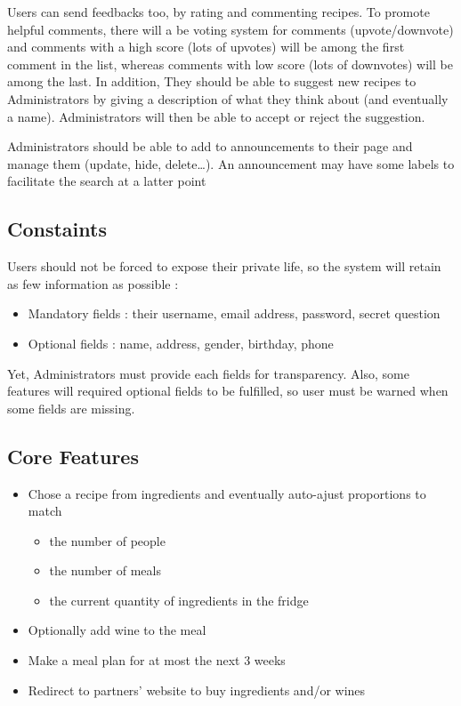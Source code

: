 \documentclass[english,12pt,twoside,a4paper]{article}
\begin{document}
Users can send feedbacks too, by rating and commenting recipes. To promote helpful comments, there will a be voting system for comments (upvote/downvote) and comments with a high score (lots of upvotes) will be among the first comment in the list, whereas comments with low score (lots of downvotes) will be among the last. In addition, They should be able to suggest new recipes to Administrators by giving a description of what they think about (and eventually a name). Administrators will then be able to accept or reject the suggestion.

Administrators should be able to add to announcements to their page and manage them (update, hide, delete…). An announcement may have some labels to facilitate the search at a latter point

\subsection{Constaints}
Users should not be forced to expose their private life, so the system will retain as few information as possible :
\begin{itemize}
  \item Mandatory fields : their username, email address, password, secret question
  \item Optional fields : name, address, gender, birthday, phone
\end{itemize}

\noindent
Yet, Administrators must provide each fields for transparency. Also, some features will required optional fields to be fulfilled, so user must be warned when some fields are missing.

\subsection{Core Features}
\begin{itemize}
  \item Chose a recipe from ingredients and eventually auto-ajust proportions to match
        \begin{itemize}
          \item the number of people
          \item the number of meals
          \item the current quantity of ingredients in the fridge
        \end{itemize}
  \item Optionally add wine to the meal
  \item Make a meal plan for at most the next 3 weeks
  \item Redirect to partners' website to buy ingredients and/or wines
\end{itemize}
\end{document}

